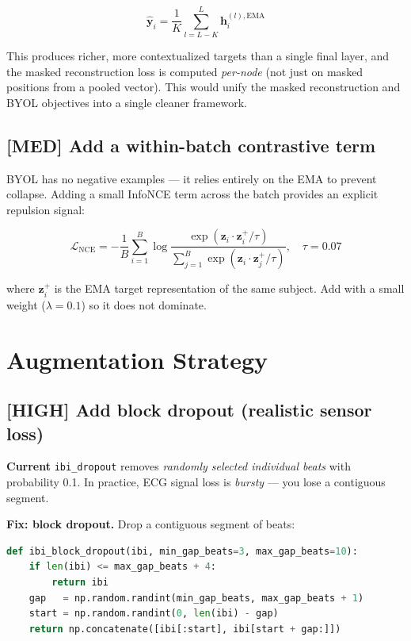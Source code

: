 \documentclass[11pt,a4paper]{article}
\newcommand{\high}[1]{\textcolor{impacthigh}{\textbf{[HIGH]} #1}}
\newcommand{\med}[1]{\textcolor{impactmed}{\textbf{[MED]} #1}}
\begin{document}
\[
    \hat{\mathbf{y}}_i = \frac{1}{K} \sum_{l=L-K}^{L} \mathbf{h}_i^{(l), \text{EMA}}
\]

This produces richer, more contextualized targets than a single final layer,
and the masked reconstruction loss is computed \emph{per-node}
(not just on masked positions from a pooled vector).
This would unify the masked reconstruction and BYOL objectives into a single
cleaner framework.

\subsection{\med{Add a within-batch contrastive term}}

BYOL has no negative examples --- it relies entirely on the EMA to prevent collapse.
Adding a small InfoNCE term across the batch provides an explicit repulsion signal:

\[
    \mathcal{L}_{\text{NCE}} = -\frac{1}{B}\sum_{i=1}^{B}
    \log \frac{\exp(\mathbf{z}_i \cdot \mathbf{z}_i^+ / \tau)}
    {\sum_{j=1}^{B} \exp(\mathbf{z}_i \cdot \mathbf{z}_j^+ / \tau)},
    \quad \tau = 0.07
\]

where $\mathbf{z}_i^+$ is the EMA target representation of the same subject.
Add with a small weight ($\lambda = 0.1$) so it does not dominate.

\section{Augmentation Strategy}

\subsection{\high{Add block dropout (realistic sensor loss)}}

\textbf{Current} \texttt{ibi\_dropout} removes \emph{randomly selected individual beats}
with probability 0.1.
In practice, ECG signal loss is \emph{bursty} --- you lose a contiguous segment.

\textbf{Fix: block dropout.}
Drop a contiguous segment of beats:
\begin{lstlisting}[language=Python]
def ibi_block_dropout(ibi, min_gap_beats=3, max_gap_beats=10):
    if len(ibi) <= max_gap_beats + 4:
        return ibi
    gap   = np.random.randint(min_gap_beats, max_gap_beats + 1)
    start = np.random.randint(0, len(ibi) - gap)
    return np.concatenate([ibi[:start], ibi[start + gap:]])
\end{lstlisting}
\end{document}
